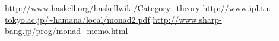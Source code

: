 \documentclass{jsarticle}
\begin{document}












\begin{thebibliography}{99}

\url{http://www.haskell.org/haskellwiki/Category_theory}
\url{http://www.ipl.t.u-tokyo.ac.jp/~hamana/local/monad2.pdf}
\url{http://www.sharp-bang.jp/prog/monad_memo.html}

\end{thebibliography}
\end{document}
